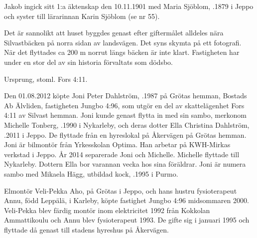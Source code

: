 Jakob ingick sitt 1:a äktenskap den 10.11.1901 med Maria Sjöblom, .1879 i Jeppo och syster till lärarinnan Karin Sjöblom (se nr 55).
\begin{jhchildren}
  \item {}
  \item {}
  \item {}
  \item {}
  \item {}
\end{jhchildren}
Det är sannolikt att huset byggdes genast efter giftermålet alldeles nära Silvastbäcken på norra sidan av landsvägen. Det syns skymta på ett fotografi. När det flyttades ca 200 m norrut längs bäcken är inte klart. Fastigheten har under en stor del av sin historia förvaltats som dödsbo.



Ursprung, stoml. Fors 4:11.


Den 01.08.2012 köpte Joni Peter Dahlström, .1987 på Grötas hemman, Bostads Ab Älvliden, fastigheten Jungbo 4:96, som	utgör en del av skattelägenhet Fors 4:11 av Silvast hemman. Joni kunde	genast flytta in med sin sambo, merkonom Michelle Tonberg, .1990 i Nykarleby, och deras dotter Ella Christina Dahlström, .2011 i Jeppo. De flyttade från en hyreslokal på Åkervägen på 	Grötas hemman. Joni är bilmontör från Yrkesskolan Optima. Han arbetar på KWH-Mirkas verkstad i Jeppo. År 2014 separerade Joni och Michelle. Michelle flyttade till Nykarleby. Dottern Ella bor varannan vecka hos sina föräldrar. Joni är numera sambo med Mikaela Hägg, utbildad kock, 	.1995 i Purmo.


Elmontör Veli-Pekka Aho,  på Grötas i Jeppo, och hans hustru fysioterapeut Annu, född Leppälä,  i Karleby, köpte fastighet Jungbo 4:96 midsommaren 2000. Veli-Pekka blev färdig montör inom elektricitet 1992 från Kokkolan Ammattikoulu och Annu blev fysioterapeut 1993. De gifte sig i januari 1995 och flyttade då genast till stadens hyreshus på Åkervägen.


